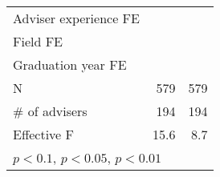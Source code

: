 {\begin{tabular}{l*{2}{D{.}{.}{-1}}}
\addlinespace
Adviser experience FE         	&     \checkmark         	&     \checkmark         \\
\addlinespace
Field FE                      	&     \checkmark         	&     \checkmark         \\
\addlinespace
Graduation year FE            	&     \checkmark         	&     \checkmark         \\
\midrule
N                             	&            579         	&            579         \\
\# of advisers                	&            194         	&            194         \\
Effective F                   	&           15.6         	&            8.7         \\
\bottomrule
{}\\
\end{tabular}
}
